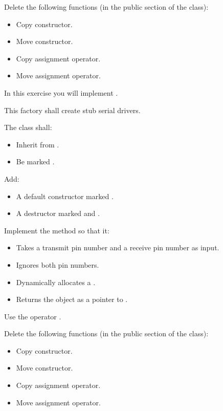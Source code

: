 Delete the following functions (in the public section of the class):
\begin{itemize}
  \item Copy constructor.
  \item Move constructor.
  \item Copy assignment operator.
  \item Move assignment operator.
\end{itemize}

\label{c4:ex:2.3}
In this exercise you will implement .

This factory shall create stub serial drivers.

The class shall:
\begin{itemize}
  \item Inherit from .
  \item Be marked .
\end{itemize}

Add:
\begin{itemize}
  \item A default constructor marked .
  \item A destructor marked  and .
\end{itemize}

Implement the method  so that it:
\begin{itemize}
  \item Takes a transmit pin number and a receive pin number as input.
  \item Ignores both pin numbers.
  \item Dynamically allocates a .
  \item Returns the object as a pointer to .
\end{itemize}
Use the operator .

Delete the following functions (in the public section of the class):
\begin{itemize}
  \item Copy constructor.
  \item Move constructor.
  \item Copy assignment operator.
  \item Move assignment operator.
\end{itemize}

